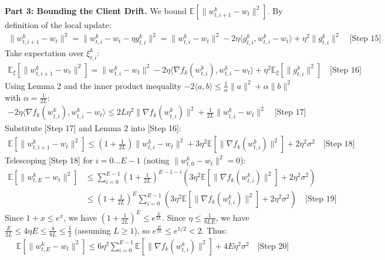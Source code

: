\documentclass{article}
\begin{document}
\textbf{Part 3: Bounding the Client Drift.} We bound $\mathbb{E}[\|w_{t,i+1}^k - w_t\|^2]$. By definition of the local update:
\begin{align}
\|w_{t,i+1}^k - w_t\|^2 = \|w_{t,i}^k - w_t - \eta g_{t,i}^k\|^2 = \|w_{t,i}^k - w_t\|^2 - 2\eta \langle g_{t,i}^k, w_{t,i}^k - w_t \rangle + \eta^2 \|g_{t,i}^k\|^2 \quad \text{[Step 15]}
\end{align}
Take expectation over $\xi_{t,i}^k$:
\begin{align}
\mathbb{E}_{\xi}[\|w_{t,i+1}^k - w_t\|^2] = \|w_{t,i}^k - w_t\|^2 - 2\eta \langle \nabla f_k(w_{t,i}^k), w_{t,i}^k - w_t \rangle + \eta^2 \mathbb{E}_{\xi}[\|g_{t,i}^k\|^2] \quad \text{[Step 16]}
\end{align}
Using Lemma 2 and the inner product inequality $-2\langle a, b \rangle \leq \frac{1}{\alpha}\|a\|^2 + \alpha\|b\|^2$ with $\alpha = \frac{1}{2L}$:
\begin{align}
- 2\eta \langle \nabla f_k(w_{t,i}^k), w_{t,i}^k - w_t \rangle \leq 2L\eta^2 \|\nabla f_k(w_{t,i}^k)\|^2 + \frac{1}{2L} \|w_{t,i}^k - w_t\|^2 \quad \text{[Step 17]}
\end{align}
Substitute [Step 17] and Lemma 2 into [Step 16]:
\begin{align}
\mathbb{E}[\|w_{t,i+1}^k - w_t\|^2] \leq \left(1 + \frac{1}{2L}\right)\|w_{t,i}^k - w_t\|^2 + 3\eta^2 \mathbb{E}[\|\nabla f_k(w_{t,i}^k)\|^2] + 2\eta^2 \sigma^2 \quad \text{[Step 18]}
\end{align}
Telescoping [Step 18] for $i=0 \dots E-1$ (noting $\|w_{t,0}^k - w_t\|^2 = 0$):
\begin{align}
\mathbb{E}[\|w_{t,E}^k - w_t\|^2] &\leq \sum_{i=0}^{E-1} \left(1 + \frac{1}{2L}\right)^{E-1-i} \left( 3\eta^2 \mathbb{E}[\|\nabla f_k(w_{t,i}^k)\|^2] + 2\eta^2 \sigma^2 \right) \\
&\leq \left(1 + \frac{1}{2L}\right)^E \sum_{i=0}^{E-1} \left( 3\eta^2 \mathbb{E}[\|\nabla f_k(w_{t,i}^k)\|^2] + 2\eta^2 \sigma^2 \right) \quad \text{[Step 19]}
\end{align}
Since $1 + x \leq e^x$, we have $\left(1 + \frac{1}{2L}\right)^E \leq e^{\frac{E}{2L}}$. Since $\eta \leq \frac{1}{8LE}$, we have $\frac{E}{2L} \leq 4\eta E \leq \frac{4}{8L} \leq \frac{1}{2}$ (assuming $L \geq 1$), so $e^{\frac{E}{2L}} \leq e^{1/2} < 2$. Thus:
\begin{align}
\mathbb{E}[\|w_{t,E}^k - w_t\|^2] \leq 6 \eta^2 \sum_{i=0}^{E-1} \mathbb{E}[\|\nabla f_k(w_{t,i}^k)\|^2] + 4 E \eta^2 \sigma^2 \quad \text{[Step 20]}
\end{align}
\end{document}
